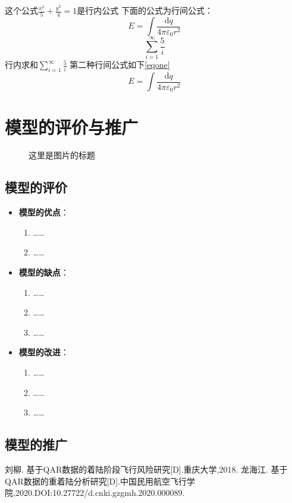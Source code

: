 \documentclass{MathorCupModeling}
\begin{document}
这个公式$\frac{x^2}{5}+\frac{y^2}{4}=1$是行内公式
下面的公式为行间公式：
$$
E=\int \frac{\mathrm{d}q}{4\pi \varepsilon_0 r^2}
$$
$$
\sum_{i = 1}^\infty  {\frac{5}{i}}
$$
行内求和$\sum\limits_{i = 1}^\infty  {\frac{5}{i}}$
第二种行间公式如下\textcolor{blue}{\cref{eqone}}
\begin{equation}\label{eqone}
E=\int \frac{\mathrm{d}q}{4\pi \varepsilon_0 r^2}
\end{equation}
	\section{模型的评价与推广}
	\begin{figure}[H]
		\caption{这里是图片的标题}\label{fig:picturename3}
	\end{figure}
	\subsection{模型的评价}
	\begin{itemize}
		\item \textbf{模型的优点}：
			\begin{enumerate}
				\item ……
				\item ……
			\end{enumerate}
		\item \textbf{模型的缺点}：
			\begin{enumerate}
				\item ……
				\item ……
				\item ……
			\end{enumerate}
		\item \textbf{模型的改进}：
			\begin{enumerate}
				\item ……
				\item ……
				\item ……
			\end{enumerate}
	\end{itemize}
	\subsection{模型的推广}

	\newpage
	\begin{thebibliography}{99}
	刘柳. 基于QAR数据的着陆阶段飞行风险研究[D].重庆大学,2018.
	龙海江. 基于QAR数据的重着陆分析研究[D].中国民用航空飞行学院,2020.DOI:10.27722/d.cnki.gzgmh.2020.000089.
	
	\end{thebibliography}
\end{document}
